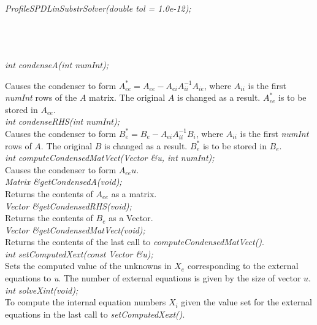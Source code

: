   \\
{\em ProfileSPDLinSubstrSolver(double tol = 1.0e-12);}  


 \\
\\ 

  \\
{\em int condenseA(int numInt);} 

Causes the condenser to form $A_{ee}^* = A_{ee} -A_{ei} A_{ii}^{-1} A_{ie}$, where
$A_{ii}$ is the first {\em numInt} rows of the $A$ matrix.  The
original $A$ is changed as a result. $A_{ee}^*$ is to be stored in $A_{ee}$. \\

{\em int condenseRHS(int numInt);} \\
Causes the condenser to form $B_e^* = B_e - A_{ei} A_{ii}^{-1} B_i$, where $A_{ii}$ 
is the first {\em numInt} rows of $A$. The original $B$ is changed as a result. 
$B_e^*$ is to be stored in $B_e$. \\

{\em int computeCondensedMatVect(Vector \&u, int numInt);} \\
Causes the condenser to form $A_{ee} u$. \\

{\em Matrix \&getCondensedA(void);} \\
Returns the contents of $A_{ee}$ as a matrix. \\

{\em Vector \&getCondensedRHS(void);} \\
Returns the contents of $B_e$ as a Vector. \\

{\em Vector \&getCondensedMatVect(void);} \\
Returns the contents of the last call to {\em
computeCondensedMatVect()}. \\

{\em int setComputedXext(const Vector \&u);} \\
Sets the computed value of the unknowns in $X_e$ corresponding to the
external equations to {\em u}. The number of external equations is
given by the size of vector $u$.\\

{\em  int solveXint(void);} \\
To compute the internal equation numbers $X_i$ given the value set
for the external equations in the last call to {\em setComputedXext()}. \\


